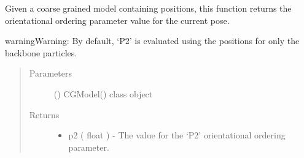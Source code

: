 \documentclass[letterpaper,12pt,english,openany,oneside]{sphinxmanual}
\begin{document}
\begin{fulllineitems}
\label{\detokenize{parameters:parameters.secondary_structure.calculate_p2}}
Given a coarse grained model containing positions, this function returns the  orientational ordering parameter value for the current pose.

\begin{sphinxadmonition}{warning}{Warning:}
By default, ‘P2’ is evaluated using the positions for only the backbone particles.
\end{sphinxadmonition}
\begin{quote}\begin{description}
\item[{Parameters}] \leavevmode
{} () \textendash{} CGModel() class object

\item[{Returns}] \leavevmode
\begin{itemize}
\item {} 
p2 ( float ) - The value for the ‘P2’ orientational ordering parameter.

\end{itemize}


\end{description}\end{quote}

\end{fulllineitems}

\end{document}
